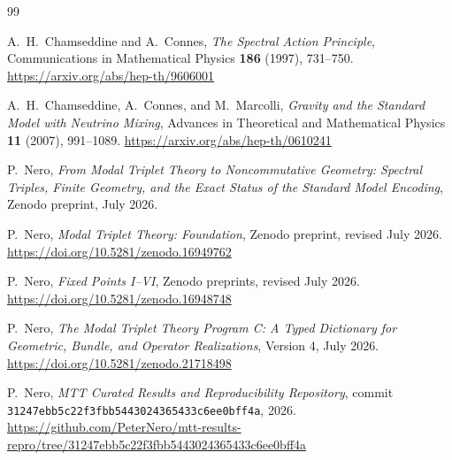 \documentclass[11pt]{article}
\begin{document}
\begin{thebibliography}{99}

A.~H.~Chamseddine and A.~Connes,
\emph{The Spectral Action Principle},
Communications in Mathematical Physics \textbf{186} (1997), 731--750.
\url{https://arxiv.org/abs/hep-th/9606001}

A.~H.~Chamseddine, A.~Connes, and M.~Marcolli,
\emph{Gravity and the Standard Model with Neutrino Mixing},
Advances in Theoretical and Mathematical Physics \textbf{11} (2007), 991--1089.
\url{https://arxiv.org/abs/hep-th/0610241}

P.~Nero,
\emph{From Modal Triplet Theory to Noncommutative Geometry:
Spectral Triples, Finite Geometry, and the Exact Status of the Standard Model
Encoding},
Zenodo preprint, July 2026.

P.~Nero,
\emph{Modal Triplet Theory: Foundation},
Zenodo preprint, revised July 2026.
\url{https://doi.org/10.5281/zenodo.16949762}

P.~Nero,
\emph{Fixed Points I--VI},
Zenodo preprints, revised July 2026.
\url{https://doi.org/10.5281/zenodo.16948748}

P.~Nero,
\emph{The Modal Triplet Theory Program C: A Typed Dictionary for Geometric,
Bundle, and Operator Realizations},
Version 4, July 2026.
\url{https://doi.org/10.5281/zenodo.21718498}

P.~Nero,
\emph{MTT Curated Results and Reproducibility Repository},
commit \texttt{31247ebb5c22f3fbb5443024365433c6ee0bff4a},
2026.
\url{https://github.com/PeterNero/mtt-results-repro/tree/31247ebb5c22f3fbb5443024365433c6ee0bff4a}

\end{thebibliography}
\end{document}
